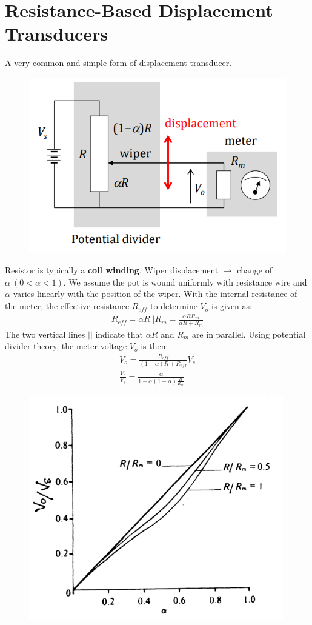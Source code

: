 \documentclass[class=report, crop=false, 12pt,a4paper]{standalone}
\begin{document}
\section{Resistance-Based Displacement Transducers}
A very common and simple form of displacement transducer.
\begin{figure}[H]
  \centering
  \includegraphics[width = 0.55 \textwidth]{../img/Mdiagram10.PNG}
\end{figure}
Resistor is typically a \textbf{coil winding}. Wiper displacement $\rightarrow$ change of $\alpha \ (0<\alpha<1)$. We assume the pot is wound uniformly with resistance wire and $\alpha$ varies linearly with the position of the wiper. With the internal resistance of the meter, the effective resistance $R_{eff}$ to determine $V_o$ is given as:
\begin{gather}
  R_{eff} = \alpha R || R_m = \frac{\alpha RR_m}{\alpha R+R_m}
\end{gather}
The two vertical lines $||$ indicate that $\alpha R$ and $R_m$ are in parallel. Using potential divider theory, the meter voltage $V_o$ is then:
\begin{gather}
  V_o = \frac{R_{eff}}{(1-\alpha)R+R_{eff}}V_s \\
  \frac{V_o}{V_s} = \frac{\alpha}{1+\alpha(1-\alpha)\frac{R}{R_m}}
\end{gather}
\begin{figure}[H]
  \centering
  \includegraphics[width = 0.55 \textwidth]{../img/Mdiagram11.PNG}
\end{figure}
\end{document}
